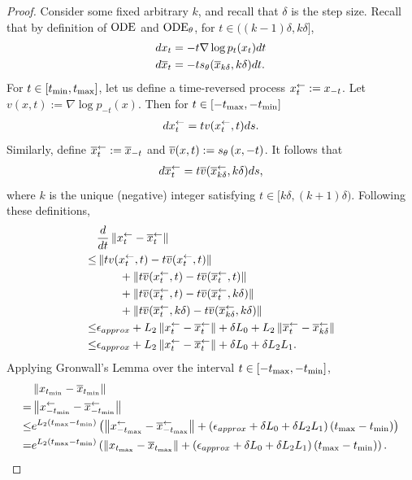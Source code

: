 \begin{proof}
    Consider some fixed arbitrary $k$, and recall that $\delta$ is the step size. Recall that by definition of $\ODE$ and $\bODE$, for $t\in((k-1)\delta, k\delta]$,
    \begin{align*}
        & d x_t = - t \nabla \log p_t(x_t) dt\\
        & d \bx_t = - t \st(\bx_{k\delta}, k\delta) dt.
    \end{align*}
    For $t\in \lrb{\tmin,\tmax}$, let us define a time-reversed process $\xr_t := x_{- t}$. Let $v(x,t) := \nabla \log p_{- t}(x)$. Then for $t\in \lrb{-\tmax , -\tmin}$
    \begin{align*}
        d \xr_t = t v(\xr_t,t) ds.
    \end{align*}
    Similarly, define $\bxr_t := \bx_{-t}$ and $\bv(x,t) := s_{\theta}\lrp{x, -t}$. It follows that
    \begin{align*}
        d \bxr_t = t \bv(\bxr_{k\delta},k\delta) ds,
    \end{align*}
    where $k$ is the unique (negative) integer satisfying $t\in [k\delta, (k+1)\delta)$. Following these definitions,
    \begin{align*}
        & \frac{d}{dt} \lrn{\xr_{t}- \bxr_{t}}\\
        \leq& \lrn{t v(\xr_t,t) - t\bv(\xr_t,t) } \\
        &\qquad + \lrn{t \bv(\xr_t,t) - t \bv(\bxr_t, t)} \\
        &\qquad + \lrn{t \bv(\bxr_t, t) - t \bv(\bxr_t, k\delta)}\\
        &\qquad + \lrn{t \bv(\bxr_t, k\delta) - t \bv(\bxr_{k\delta}, k\delta)} \\
        \leq& \eapprox + L_2 \lrn{\xr_t - \bxr_t} + \delta L_0 + L_2 \lrn{\bxr_t - \bxr_{k\delta}}\\
        \leq&  \eapprox + L_2 \lrn{\xr_t - \bxr_t} + \delta L_0 + \delta L_2 L_1.
    \end{align*}
    Applying Gronwall's Lemma over the interval $t\in[-\tmax, -\tmin]$,
    \begin{align*}
        & \lrn{x_{\tmin} - \bx_{\tmin}}\\
        =& \lrn{\xr_{-\tmin} - \bxr_{-\tmin}}\\
        \leq& e^{L_2 \lrp{\tmax - \tmin}} \lrp{\lrn{\xr_{-\tmax} - \bxr_{-\tmax}} + \lrp{\eapprox + \delta L_0 + \delta L_2 L_1}\lrp{\tmax - \tmin}}\\
        =& e^{L_2 \lrp{\tmax - \tmin}} \lrp{\lrn{x_{\tmax} - \bx_{\tmax}} + \lrp{\eapprox + \delta L_0 + \delta L_2 L_1}\lrp{\tmax - \tmin}}.
    \end{align*}
\end{proof}


